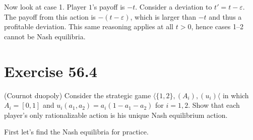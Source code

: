 \documentclass[11pt]{article}
\begin{document}
Now look at case 1. Player \(1\)'s payoff is \(-t\). Consider a deviation to \(t' = t - \varepsilon\). The payoff from this action is \(- (t - \varepsilon)\), which is larger than \(-t\) and thus a profitable deviation. This same reasoning applies at all \(t >0\), hence cases 1--2 cannot be Nash equilibria.

\newpage

\section{Exercise 56.4}
\label{sec:org51eeb87}
(Cournot duopoly) Consider the strategic game \(\langle \{1, 2\},
(A_i), (u_i)\langle\) in which \(A_i = [0, 1]\) and \(u_i(a_1, a_2) = a_i(1 - a_1 - a_2)\) for \(i = 1,
2\). Show that each player’s only rationalizable action is his unique Nash
equilibrium action.


First let's find the Nash equilibria for practice.
\end{document}
